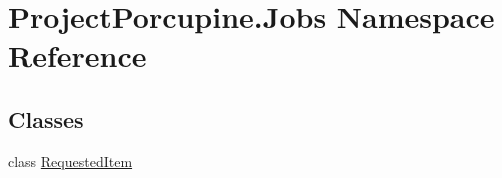 \hypertarget{namespace_project_porcupine_1_1_jobs}{}\section{Project\+Porcupine.\+Jobs Namespace Reference}
\label{namespace_project_porcupine_1_1_jobs}
\subsection*{Classes}
\begin{DoxyCompactItemize}
\item 
class \hyperlink{class_project_porcupine_1_1_jobs_1_1_requested_item}{Requested\+Item}
\end{DoxyCompactItemize}

